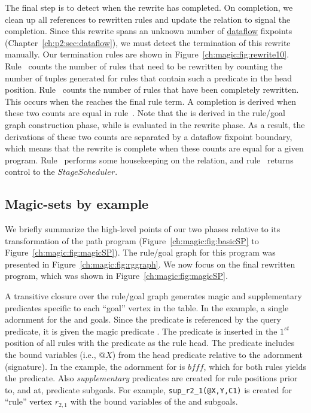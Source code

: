 The final step is to detect when the rewrite has completed.  On completion, we
clean up all references to rewritten rules and update the  relation
to signal the completion.  Since this rewrite spans an unknown number of
\underline{dataflow} fixpoints (Chapter~\ref{ch:p2:sec:dataflow}), we must
detect the termination of this rewrite manually.  Our termination rules are
shown in Figure~\ref{ch:magic:fig:rewrite10}.  Rule~ counts the number
of rules that need to be rewritten by counting the number of
 tuples generated for rules that contain such a predicate
in the head position.  Rule~ counts the number of rules that have been
completely rewritten.  This occurs when the  reaches the final
rule term.  A completion is derived when these two counts are equal in
rule~.  Note that the  is derived in the rule/goal
graph construction phase, while  is evaluated in the rewrite
phase.  As a result, the derivations of these two counts are separated by a
dataflow fixpoint boundary, which means that the rewrite is complete when these
counts are equal for a given program.  Rule~ performs some
housekeeping on the  relation, and rule~ returns control to
the $StageScheduler$.

\subsection{Magic-sets by example}

We briefly summarize the high-level points of our two phases relative to its
transformation of the path program (Figure~\ref{ch:magic:fig:basicSP} to
Figure~\ref{ch:magic:fig:magicSP}).  The rule/goal graph for this program was
presented in Figure~\ref{ch:magic:fig:rggraph}.  We now focus on the final
rewritten program, which was shown in Figure~\ref{ch:magic:fig:magicSP}.

A transitive closure over the rule/goal graph generates magic and supplementary
predicates specific to each ``goal'' vertex in the  table.  In
the example, a single adornment for the  and  goals.  Since
the  predicate is referenced by the query predicate, it is given the
magic predicate .  The  predicate is inserted
in the $1^{st}$ position of all rules with the  predicate as the rule
head.  The  predicate includes the bound variables (i.e., $@X$)
from the  head predicate relative to the  adornment
(signature).  In the example, the adornment for  is $bfff$, which for
both rules yields the  predicate.  Also
{\em supplementary} predicates are created for rule positions prior to, and
at,  predicate subgoals.  For example, {\tt sup\_r2\_1(@X,Y,C1)} is
created for ``rule'' vertex $r_{2,1}$ with the bound variables of the
 and  subgoals.

